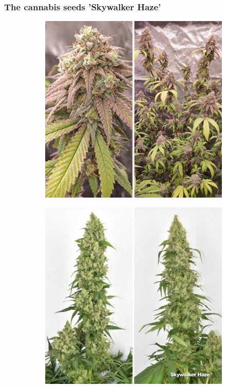\documentclass[12pt, aspectratio=1610]{beamer}
\begin{document}
    \begin{frame}
        \frametitle{The cannabis seeds 'Skywalker Haze'}
        \begin{figure}
            \begin{subfigure}[t]{.48\textwidth}
                \includegraphics[width=\linewidth]{../figures/DUTCH-PASSION_Skywalker-Haze_1}
            \end{subfigure}
            \hfill
            \begin{subfigure}[t]{.48\textwidth}
                \includegraphics[width=\linewidth]{../figures/DUTCH-PASSION_Skywalker-Haze_2}

\end{subfigure}
\end{figure}
\end{frame}
\end{document}
